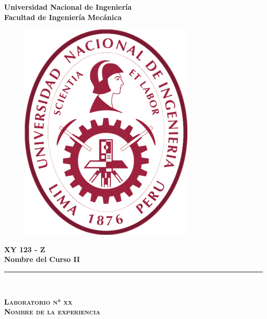 \begin{titlepage}
	\begin{center}
		
		{\LARGE \textbf{Universidad Nacional de Ingeniería}}\\
		\vspace{10pt}
		{\large \textbf{Facultad de Ingeniería Mecánica}}\\
		\vspace{25pt}
				
		\begin{figure}[h]
			\centering
			\includegraphics[scale = .5]{caratula/uni-logo}		
		\end{figure}
		\vspace{25pt}
		
		{\Large \textbf{XY 123 - Z}}\\
		\vspace{10pt}		
		{\Large \textbf{Nombre del Curso II}}\\
		\vspace{15pt}		
		
		\rule{\linewidth}{1.5pt}\\
		\vspace{3mm}
		
		\begin{spacing}{1.5}
			\textsc{{\LARGE \textbf{Laboratorio n° xx}}\\
			{\large \textbf{Nombre de la experiencia}}}
		\end{spacing}
		

\end{center}
\end{titlepage}

